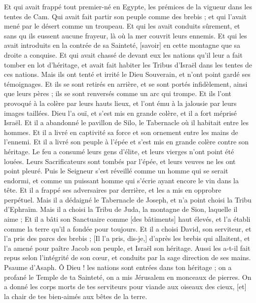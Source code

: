 \begin{multicols}{2}
Et qui avait frappé tout premier-né en Egypte, les prémices de la vigueur dans les tentes de Cam.
Qui avait fait partir son peuple comme des brebis ; et qui l'avait mené par le désert comme un troupeau.
Et qui les avait conduits sûrement, et sans qu ils eussent aucune frayeur, là où la mer couvrit leurs ennemis.
Et qui les avait introduits en la contrée de sa Sainteté, [savoir] en cette montagne que sa droite a conquise.
Et qui avait chassé de devant eux les nations qu'il leur a fait tomber en lot d'héritage, et avait fait habiter les Tribus d'Israël dans les tentes de ces nations.
Mais ils ont tenté et irrité le Dieu Souverain, et n'ont point gardé ses témoignages.
Et ils se sont retirés en arrière, et se sont portés infidèlement, ainsi que leurs pères ; ils se sont renversés comme un arc qui trompe.
Et ils l'ont provoqué à la colère par leurs hauts lieux, et l'ont ému à la jalousie par leurs images taillées.
Dieu l'a ouï, et s'est mis en grande colère, et il a fort méprisé Israël.
Et il a abandonné le pavillon de Silo, le Tabernacle où il habitait entre les hommes.
Et il a livré en captivité sa force et son ornement entre les mains de l'ennemi.
Et il a livré son peuple à l'épée et s'est mis en grande colère contre son héritage.
Le feu a consumé leurs gens d'élite, et leurs vierges n'ont point été louées.
Leurs Sacrificateurs sont tombés par l'épée, et leurs veuves ne les ont point pleuré.
Puis le Seigneur s'est réveillé comme un homme qui se serait endormi, et comme un puissant homme qui s'écrie ayant encore le vin dans la tête.
Et il a frappé ses adversaires par derrière, et les a mis en opprobre perpétuel.
Mais il a dédaigné le Tabernacle de Joseph, et n'a point choisi la Tribu d'Ephraïm.
Mais il a choisi la Tribu de Juda, la montagne de Sion, laquelle il aime ;
Et il a bâti son Sanctuaire comme [des bâtiments] haut élevés, et l'a établi comme la terre qu'il a fondée pour toujours.
Et il a choisi David, son serviteur, et l'a pris des parcs des brebis ;
[Il l'a pris, dis-je,] d'après les brebis qui allaitent, et l'a amené pour paître Jacob son peuple, et Israël son héritage.
Aussi les a-t-il fait repus selon l'intégrité de son cœur, et conduits par la sage direction de ses mains.
\VerseOne{}Psaume d'Asaph. Ô Dieu ! les nations sont entrées dans ton héritage ; on a profané le Temple de ta Sainteté, on a mis Jérusalem en monceaux de pierres.
On a donné les corps morts de tes serviteurs pour viande aux oiseaux des cieux, [et] la chair de tes bien-aimés aux bêtes de la terre.

\end{multicols}

